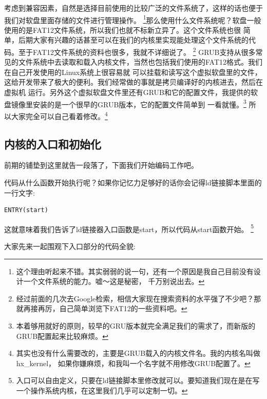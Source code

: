 \par 考虑到兼容因素，自然是选择目前使用的比较广泛的文件系统了，这样的话也便于我们对软盘里面存储的文件进行管理操作。\allowbreak
\footnote{这个理由听起来不错。其实弱弱的说一句，还有一个原因是我自己目前没有设计一个文件系统的能力。嘘～这是秘密，\allowbreak
千万别说出去。}那么使用什么文件系统呢？软盘一般使用的是FAT12文件系统，所以我们也就不标新立异了。这个文件系统也很\allowbreak
简单，后期大家有兴趣的话甚至可以在我们的内核里实现能处理这个文件系统的代码。至于FAT12文件系统的资料也很多，我就不详细说了。\allowbreak
\footnote{经过前面的几次去Google检索，相信大家现在搜索资料的水平强了不少吧？那就再接再厉，自己简单浏览下FAT12的一些资料吧。}\allowbreak
GRUB支持从很多常见的文件系统中去读取和载入内核文件，当然也包括我们使用的FAT12格式。我们在自己开发使用的Linux系统上很容易就\allowbreak
可以挂载和读写这个虚拟软盘里的文件，这给开发带来了极大的便利。我们经常做的事就是拷贝编译好的内核进去，然后在虚拟机\allowbreak
运行。另外这个虚拟软盘文件里还有GRUB和它的配置文件，我提供的软盘镜像里安装的是一个很早的GRUB版本，它的配置文件简单到\allowbreak
一看就懂。\footnote{本着够用就好的原则，较早的GRU版本就完全满足我们的需求了，而新版的GRUB配置起来比较麻烦。}\allowbreak
所以大家完全可以自己看着修改。\footnote{其实也没有什么需要改的，主要是GRUB载入的内核文件名。我的内核名叫做hx\_kernel，\allowbreak
如果你嫌麻烦，和我叫一个名字就不用修改GRUB配置了。}

\subsection{内核的入口和初始化}

\par 前期的铺垫到这里就告一段落了，下面我们开始编码工作吧。

\par 代码从什么函数开始执行呢？如果你记忆力足够好的话你会记得ld链接脚本里面的一行文字:

\begin{Verbatim}[frame=single]
  ENTRY(start)
\end{Verbatim}

\par 这就意味着我们告诉了ld链接器入口函数是start，所以代码从start函数开始。\allowbreak
\footnote{入口可以自由定义，只要在ld链接脚本里修改就可以。要知道我们现在是在写一个操作系统内核，在这里我们几乎可以定制一切。}

\par 大家先来一起围观下入口部分的代码全貌:

